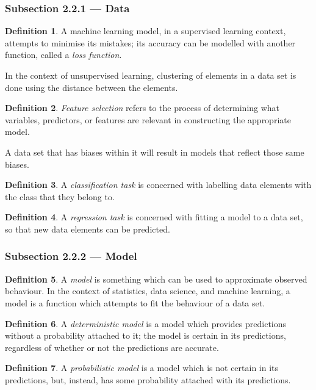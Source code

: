 \documentclass{article}
\theoremstyle{definition}
\newtheorem{definition}{Definition}[section]
\begin{document}
\subsubsection{Subsection 2.2.1 --- Data}
\begin{definition}
    A machine learning model, in a supervised learning context, attempts to minimise its mistakes; its accuracy can be modelled with another function, called a \emph{loss function}.
\end{definition}
In the context of unsupervised learning, clustering of elements in a data set is done using the distance between the elements.
\begin{definition}
    \emph{Feature selection} refers to the process of determining what variables, predictors, or features are relevant in constructing the appropriate model.
\end{definition}
A data set that has biases within it will result in models that reflect those same biases.
\begin{definition}
    A \emph{classification task} is concerned with labelling data elements with the class that they belong to.
\end{definition}
\begin{definition}
    A \emph{regression task} is concerned with fitting a model to a data set, so that new data elements can be predicted.
\end{definition}

\subsubsection{Subsection 2.2.2 --- Model}
\begin{definition}
    A \emph{model} is something which can be used to approximate observed behaviour. In the context of statistics, data science, and machine learning, a model is a function which attempts to fit the behaviour of a data set.
\end{definition}
\begin{definition}
    A \emph{deterministic model} is a model which provides predictions without a probability attached to it; the model is certain in its predictions, regardless of whether or not the predictions are accurate.
\end{definition}
\begin{definition}
    A \emph{probabilistic model} is a model which is not certain in its predictions, but, instead, has some probability attached with its predictions.
\end{definition}
\end{document}
